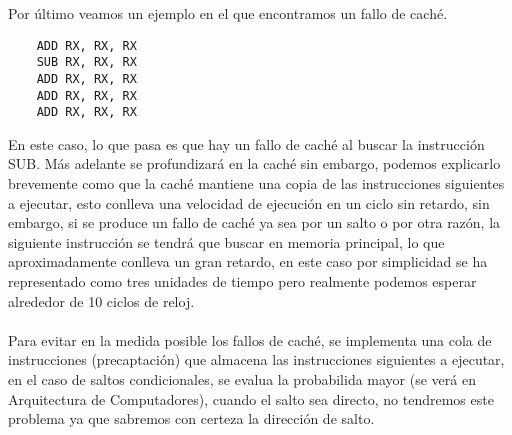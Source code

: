 Por último veamos un ejemplo en el que encontramos un fallo de caché.
\begin{center}
    \begin{minipage}{0.3\textwidth}
        \begin{verbatim}
    ADD RX, RX, RX
    SUB RX, RX, RX
    ADD RX, RX, RX
    ADD RX, RX, RX
    ADD RX, RX, RX
        \end{verbatim}
    \end{minipage}
    \begin{minipage}{0.28\textwidth}
        

    \end{minipage}
    \begin{minipage}{0.38\textwidth}
        
    \end{minipage}
\end{center}
En este caso, lo que pasa es que hay un fallo de caché al buscar la instrucción SUB. Más adelante se profundizará en la caché sin embargo, 
podemos explicarlo brevemente como que la caché mantiene una copia de las instrucciones siguientes a ejecutar, esto conlleva una velocidad de 
ejecución en un ciclo sin retardo, sin embargo, si se produce un fallo de caché ya sea por un salto o por otra razón, la siguiente instrucción se 
tendrá que buscar en memoria principal, lo que aproximadamente conlleva un gran retardo, en este caso por simplicidad se ha representado como tres 
unidades de tiempo pero realmente podemos esperar alrededor de 10 ciclos de reloj.
\\ \\ 
Para evitar en la medida posible los fallos de caché, se implementa una cola de instrucciones (precaptación) que almacena las instrucciones siguientes a ejecutar,
en el caso de saltos condicionales, se evalua la probabilida mayor (se verá en Arquitectura de Computadores), cuando el salto sea directo, no tendremos este problema ya que 
sabremos con certeza la dirección de salto.
